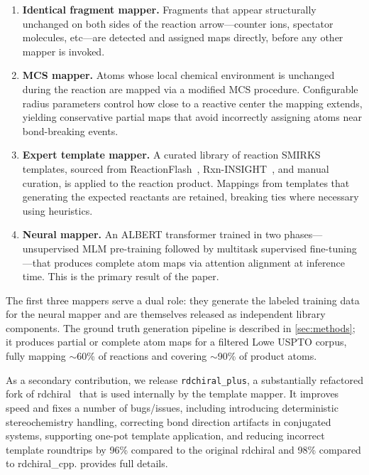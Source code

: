 \documentclass[12pt]{article}
\begin{document}
\begin{enumerate}[leftmargin=*, label=(\arabic*)]
  \item \textbf{Identical fragment mapper.}  Fragments that appear
        structurally unchanged on both sides of the reaction arrow---counter
        ions, spectator molecules, etc---are detected
        and assigned maps directly, before any other mapper is invoked.
  \item \textbf{MCS mapper.}  Atoms whose local chemical environment is
      unchanged during the reaction are mapped via a modified MCS
      procedure.  Configurable radius parameters control how close to a
      reactive center the mapping extends, yielding conservative partial
      maps that avoid incorrectly assigning atoms near bond-breaking events.
  \item \textbf{Expert template mapper.}  A curated library of reaction
        SMIRKS templates, sourced from ReactionFlash~\cite{ReactionFlash}, Rxn-INSIGHT~\cite{Probst2022},
        and manual curation, is applied to the reaction product.  Mappings from templates
        that generating the expected reactants are retained, breaking ties where necessary using heuristics.
  \item \textbf{Neural mapper.}  An ALBERT transformer trained in two
        phases---unsupervised MLM pre-training followed by multitask
        supervised fine-tuning---that produces complete atom maps via
        attention alignment at inference time.  This is the primary result
        of the paper.
\end{enumerate}

The first three mappers serve a dual role: they generate the labeled
training data for the neural mapper and are themselves released as
independent library components.  The ground truth generation pipeline
is described in \cref{sec:methods}; it produces partial or complete
atom maps for a filtered Lowe USPTO corpus, fully mapping $\sim$60\%
of reactions and covering $\sim$90\% of product atoms.

As a secondary contribution, we release \texttt{rdchiral\_plus}, a
substantially refactored fork of rdchiral~\cite{Coley2019rdchiral}
that is used internally by the template mapper.  It improves speed and fixes a number of 
bugs/issues, including introducing deterministic stereochemistry handling, correcting bond direction
artifacts in conjugated systems, supporting one-pot template application,
and reducing incorrect template roundtrips by 96\% compared to the
original rdchiral and 98\% compared to rdchiral\_cpp.
 provides full details.
\end{document}
